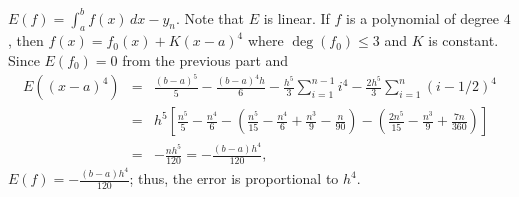 \documentclass{ximera}
\begin{document}
\begin{problem}
\begin{enumerate}
\begin{solution}
    $E(f)=\int_a^bf(x)\,dx-y_n$. Note that $E$ is linear.
If $f$ is a polynomial of degree $4$, then $f(x)=f_0(x)+K(x-a)^4$
where $\deg(f_0)\le3$ and $K$ is constant. Since
$E(f_0)=0$ from the previous part and
\begin{eqnarray*}
E((x-a)^4)&=&\frac{(b-a)^5}{5}-\frac{(b-a)^4h}{6}-\frac{h^5}{3}\sum_{i=1}^{n-1}
i^4-\frac{2h^5}{3}\sum_{i=1}^n(i-1/2)^4\\
&=&h^5\left[\frac{n^5}{5}-\frac{n^4}{6}-\left(\frac{n^5}{15}
-\frac{n^4}{6}+\frac{n^3}{9}-\frac{n}{90}\right)-\left(
\frac{2n^5}{15}-\frac{n^3}{9}+\frac{7n}{360}\right)\right]\\
&=&-\frac{nh^5}{120}=-\frac{(b-a)h^4}{120},
\end{eqnarray*}
$E(f)=-\frac{(b-a)h^4}{120}$; thus, the error is proportional to
$h^4$.
\end{solution}
\end{enumerate}
\end{problem}
\end{document}
